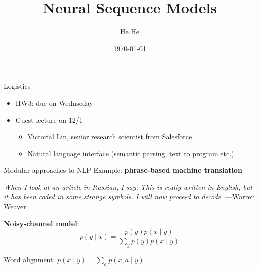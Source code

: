 \documentclass[usenames,dvipsnames,notes]{beamer}
\title[CSCI-GA.2590]{Neural Sequence Models}
\author[He He]{He He
}
\institute[NYU]{New York University}
\date{\today}
\begin{document}
\begin{frame}
\titlepage
\end{frame}

\begin{frame}
    {Logistics}
    \begin{itemize}
        \item HW3: due on Wednseday
        \item Guest lecture on 12/1
            \begin{itemize}
                \item Victorial Lin, senior research scientist from Salesforce
                \item Natural language interface (semantic parsing, text to program etc.)
            \end{itemize}
    \end{itemize}
\end{frame}

\begin{frame}
    {Modular approaches to NLP}
    Example: \textbf{phrase-based machine translation}

    \textit{When I look at an article in Russian, I say: This is really written in English, but it has been coded in some strange symbols. I will now proceed to decode.} ---Warren Weaver

    \textbf{Noisy-channel model}:
    $$
    p(y\mid x) = \frac{p(y)p(x\mid y)}{\sum_y p(y)p(x\mid y)}
    $$

    Word alignment: $p(x\mid y) = \sum_a p(x,a\mid y)$
    
\end{frame}
\end{document}
